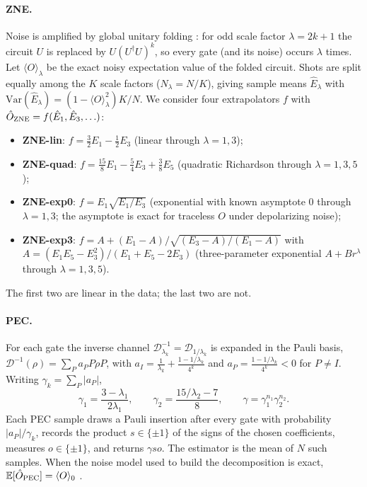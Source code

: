 \documentclass[11pt,a4paper]{article}
\theoremstyle{remark}
\newcommand{\E}{\mathbb{E}}
\newcommand{\Var}{\mathrm{Var}}
\begin{document}
\paragraph{ZNE.} Noise is amplified by global unitary folding \cite{giurgicatiron2020}: for odd scale factor $\lambda=2k+1$ the circuit $U$ is replaced by $U(U^\dagger U)^k$, so every gate (and its noise) occurs $\lambda$ times. Let $\langle O\rangle_\lambda$ be the exact noisy expectation value of the folded circuit. Shots are split equally among the $K$ scale factors ($N_\lambda = N/K$), giving sample means $\hat E_\lambda$ with $\Var(\hat E_\lambda)=(1-\langle O\rangle_\lambda^2)K/N$. We consider four extrapolators $f$ with $\hat O_{\rm ZNE}=f(\hat E_1,\hat E_3,\ldots)$:
\begin{itemize}
\item \textbf{ZNE-lin}: $f=\tfrac32 E_1-\tfrac12 E_3$ (linear through $\lambda=1,3$);
\item \textbf{ZNE-quad}: $f=\tfrac{15}{8}E_1-\tfrac54 E_3+\tfrac38 E_5$ (quadratic Richardson through $\lambda=1,3,5$);
\item \textbf{ZNE-exp0}: $f=E_1\sqrt{E_1/E_3}$ (exponential with known asymptote $0$ through $\lambda=1,3$; the asymptote is exact for traceless $O$ under depolarizing noise);
\item \textbf{ZNE-exp3}: $f=A+(E_1-A)/\sqrt{(E_3-A)/(E_1-A)}$ with $A=(E_1E_5-E_3^2)/(E_1+E_5-2E_3)$ (three-parameter exponential $A+Br^\lambda$ through $\lambda=1,3,5$).
\end{itemize}
The first two are linear in the data; the last two are not.

\paragraph{PEC.} For each gate the inverse channel $\mathcal D_{\lambda_k}^{-1}=\mathcal D_{1/\lambda_k}$ is expanded in the Pauli basis, $\mathcal D^{-1}(\rho)=\sum_P a_P P\rho P$, with $a_I = \tfrac1{\lambda_k}+\tfrac{1-1/\lambda_k}{4^k}$ and $a_P=\tfrac{1-1/\lambda_k}{4^k}<0$ for $P\neq I$. Writing $\gamma_k=\sum_P|a_P|$,
\begin{equation}
\gamma_1=\frac{3-\lambda_1}{2\lambda_1},\qquad \gamma_2=\frac{15/\lambda_2-7}{8},\qquad
\gamma = \gamma_1^{n_1}\gamma_2^{n_2}.
\label{eq:gamma}
\end{equation}
Each PEC sample draws a Pauli insertion after every gate with probability $|a_P|/\gamma_k$, records the product $s\in\{\pm1\}$ of the signs of the chosen coefficients, measures $o\in\{\pm1\}$, and returns $\gamma s o$. The estimator is the mean of $N$ such samples. When the noise model used to build the decomposition is exact, $\E[\hat O_{\rm PEC}]=\langle O\rangle_0$ \cite{temme2017}.
\end{document}
